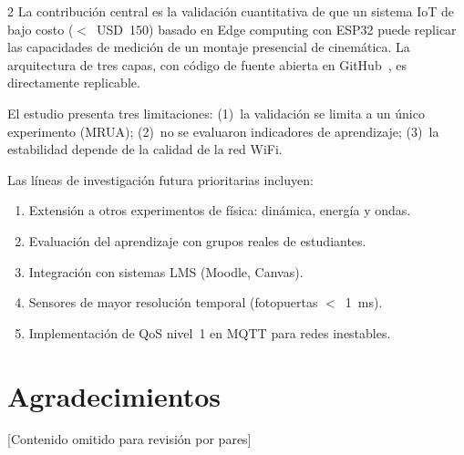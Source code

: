 \documentclass[12pt,twoside,titlepage]{ingenius}
\begin{document}
\begin{multicols}{2}
La contribuci\'on central es la validaci\'on cuantitativa de que un sistema IoT de bajo costo ($<$~USD~150) basado en Edge computing con ESP32 puede replicar las capacidades de medici\'on de un montaje presencial de cinem\'atica. La arquitectura de tres capas, con c\'odigo de fuente abierta en GitHub~\cite{r15}, es directamente replicable.

El estudio presenta tres limitaciones: (1)~la validaci\'on se limita a un \'unico experimento (MRUA); (2)~no se evaluaron indicadores de aprendizaje; (3)~la estabilidad depende de la calidad de la red WiFi.

Las l\'ineas de investigaci\'on futura prioritarias incluyen:
\begin{enumerate}
  \item Extensi\'on a otros experimentos de f\'isica: din\'amica, energ\'ia y ondas.
  \item Evaluaci\'on del aprendizaje con grupos reales de estudiantes.
  \item Integraci\'on con sistemas LMS (Moodle, Canvas).
  \item Sensores de mayor resoluci\'on temporal (fotopuertas $<$~1~ms).
  \item Implementaci\'on de QoS nivel~1 en MQTT para redes inestables.
\end{enumerate}


\section*{Agradecimientos}
[Contenido omitido para revisi\'on por pares]



\end{multicols}
\end{document}
